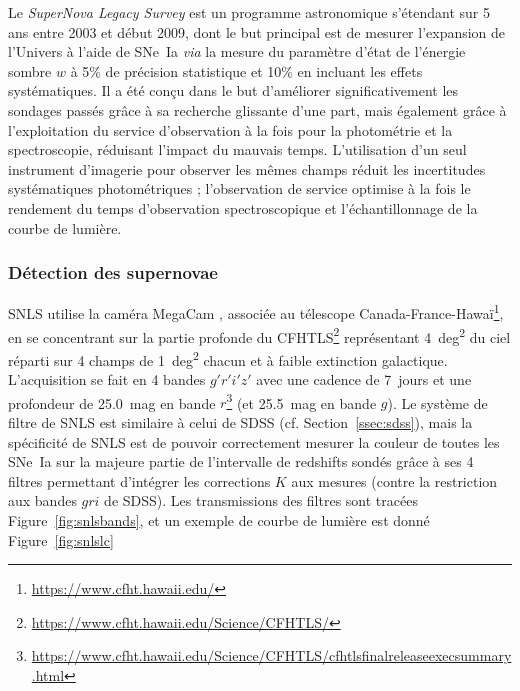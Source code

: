 \documentclass[../main/main.tex]{subfiles}
\begin{document}
Le \textit{SuperNova Legacy Survey} \citep[SNLS,][]{astier2006, sullivan2011}
est un programme astronomique s'étendant sur 5 ans entre 2003 et début 2009,
dont le but principal est de mesurer l'expansion de l'Univers à l'aide de SNe~Ia
\textit{via} la mesure du paramètre d'état de l'énergie sombre $w$ à 5\% de
précision statistique et 10\% en incluant les effets systématiques. Il a été
conçu dans le but d'améliorer significativement les sondages passés grâce à sa
recherche glissante d'une part, mais également grâce à l'exploitation du service
d'observation à la fois pour la photométrie et la spectroscopie, réduisant
l'impact du mauvais temps. L'utilisation d'un seul instrument d'imagerie pour
observer les mêmes champs réduit les incertitudes systématiques photométriques ;
l'observation de service optimise à la fois le rendement du temps d'observation
spectroscopique et l'échantillonnage de la courbe de lumière.

\subsubsection{Détection des supernovae}\label{sssec:snlsdetec}

SNLS utilise la caméra MegaCam \citep{boulade2003}, associée au télescope
Canada-France-Hawaï\footnote{\href{https://www.cfht.hawaii.edu/}
{https://www.cfht.hawaii.edu/}}, en se concentrant sur la partie profonde du
CFHTLS\footnote{\href{https://www.cfht.hawaii.edu/Science/CFHTLS/}
{https://www.cfht.hawaii.edu/Science/CFHTLS/}} représentant \SI{4}{deg^2} du
ciel réparti sur 4 champs de \SI{1}{deg^2} chacun et à faible extinction
galactique. L'acquisition se fait en 4 bandes $g'r'i'z'$ avec une cadence de
\SI{7}{jours} et une profondeur de \SI{25,0}{mag} en bande
$r$\footnote{\href{https://www.cfht.hawaii.edu/Science/CFHTLS/cfhtlsfinalreleaseexecsummary.html}
{https://www.cfht.hawaii.edu/Science/CFHTLS/cfhtlsfinalreleaseexecsummary.html}}
(et \SI{25,5}{mag} en bande $g$). Le système de filtre de SNLS est similaire à
celui de SDSS (cf. Section~\ref{ssec:sdss}), mais la spécificité de SNLS est de
pouvoir correctement mesurer la couleur de toutes les SNe~Ia sur la majeure
partie de l'intervalle de redshifts sondés grâce à ses 4 filtres permettant
d'intégrer les corrections $K$ aux mesures (contre la restriction aux bandes
$gri$ de SDSS). Les transmissions des filtres sont tracées
Figure~\ref{fig:snlsbands}, et un exemple de courbe de lumière est donné
Figure~\ref{fig:snlslc}
\end{document}
